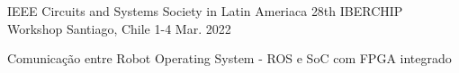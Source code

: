 

\begin{cventries}

  \cventry
    {IEEE Circuits and Systems Society in Latin Ameriaca} %
    {28th IBERCHIP Workshop} %
    {Santiago, Chile} %
    {1-4 Mar. 2022} %
    {
      \begin{cvitems} %
        \item {Comunicação entre Robot Operating System - ROS e SoC com FPGA integrado}
      \end{cvitems}
    }


\end{cventries}
